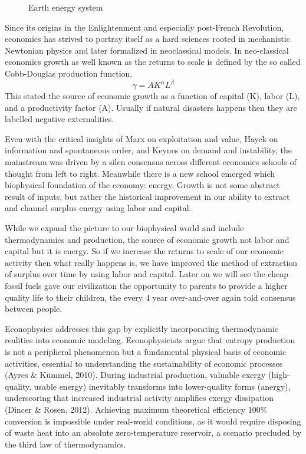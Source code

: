 \documentclass[a4paper,12pt]{article}
\begin{document}
\begin{figure}[h!]
    \centering
    
    \caption{Earth energy system}
\end{figure}

Since its origins in the Enlightenment and especially post-French Revolution, economics has strived to portray itself as a hard sciences rooted in mechanistic Newtonian physics and later formalized in neoclassical models. In neo-classical economics growth as well known as the returns to scale is defined by the so called Cobb-Douglas production function.
\[
\gamma = A K^{\alpha} L^{\beta}
\]
This stated the source of economic growth as a function of capital (K), labor (L), and a productivity factor (A). Usually if natural disasters happens then they are labelled negative externalities.

Even with the critical insights of Marx on exploitation and value, Hayek on information and spontaneous order, and Keynes on demand and instability, the mainstream was driven by a silen consensus across different economics schools of thought from left to right. Meanwhile there is a new school emerged which biophysical foundation of the economy: energy. Growth is not some abstract result of inputs, but rather the historical improvement in our ability to extract and channel surplus energy using labor and capital.

While we expand the picture to our biophysical world and include thermodynamics and production, the source of economic growth not labor and capital but it is energy. So if we increase the returns to scale of our economic activity then what really happens is, we have improved the method of extraction of surplus over time by using labor and capital. Later on we will see the cheap fossil fuels gave our civilization the opportunity to parents to provide a higher quality life to their children, the every 4 year over-and-over again told consensus between people. 

Econophysics addresses this gap by explicitly incorporating thermodynamic realities into economic modeling. Econophysicists argue that entropy production is not a peripheral phenomenon but a fundamental physical basis of economic activities, essential to understanding the sustainability of economic processes (Ayres & Kümmel, 2010). During industrial production, valuable exergy (high-quality, usable energy) inevitably transforms into lower-quality forms (anergy), underscoring that increased industrial activity amplifies exergy dissipation (Dincer & Rosen, 2012). Achieving maximum theoretical efficiency 100$\%$ conversion is impossible under real-world conditions, as it would require disposing of waste heat into an absolute zero-temperature reservoir, a scenario precluded by the third law of thermodynamics.
\end{document}
